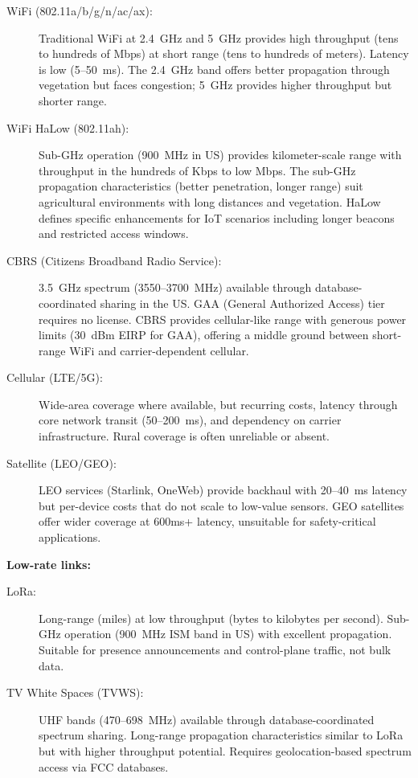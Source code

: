 \begin{description}
    \item[WiFi (802.11a/b/g/n/ac/ax):] Traditional WiFi at 2.4~GHz and 5~GHz provides high throughput (tens to hundreds of Mbps) at short range (tens to hundreds of meters). Latency is low (5--50~ms). The 2.4~GHz band offers better propagation through vegetation but faces congestion; 5~GHz provides higher throughput but shorter range.

    \item[WiFi HaLow (802.11ah):] Sub-GHz operation (900~MHz in US) provides kilometer-scale range with throughput in the hundreds of Kbps to low Mbps. The sub-GHz propagation characteristics (better penetration, longer range) suit agricultural environments with long distances and vegetation. HaLow defines specific enhancements for IoT scenarios including longer beacons and restricted access windows.

    \item[CBRS (Citizens Broadband Radio Service):] 3.5~GHz spectrum (3550--3700~MHz) available through database-coordinated sharing in the US. GAA (General Authorized Access) tier requires no license. CBRS provides cellular-like range with generous power limits (30~dBm EIRP for GAA), offering a middle ground between short-range WiFi and carrier-dependent cellular.

    \item[Cellular (LTE/5G):] Wide-area coverage where available, but recurring costs, latency through core network transit (50--200~ms), and dependency on carrier infrastructure. Rural coverage is often unreliable or absent.

    \item[Satellite (LEO/GEO):] LEO services (Starlink, OneWeb) provide backhaul with 20--40~ms latency but per-device costs that do not scale to low-value sensors. GEO satellites offer wider coverage at 600ms+ latency, unsuitable for safety-critical applications.
\end{description}

\textbf{Low-rate links:}

\begin{description}
    \item[LoRa:] Long-range (miles) at low throughput (bytes to kilobytes per second). Sub-GHz operation (900~MHz ISM band in US) with excellent propagation. Suitable for presence announcements and control-plane traffic, not bulk data.

    \item[TV White Spaces (TVWS):] UHF bands (470--698~MHz) available through database-coordinated spectrum sharing. Long-range propagation characteristics similar to LoRa but with higher throughput potential. Requires geolocation-based spectrum access via FCC databases.
\end{description}

